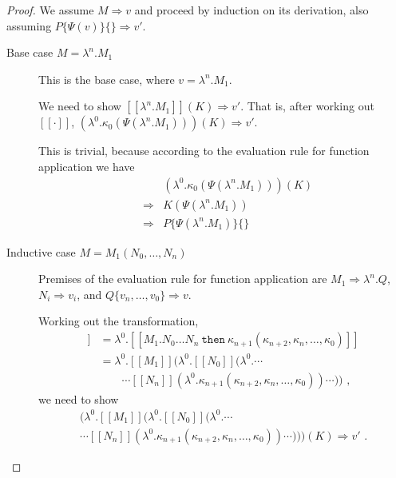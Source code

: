 \documentclass[a4paper,11pt,draft]{article}
\newcommand{\kw}[1]{\mathtt{#1}}
\begin{document}
\begin{proof}
We assume $M \Rightarrow v$ and proceed by induction on its derivation, also
assuming $P\{\Psi(v)\}\{\} \Rightarrow v'$.

\begin{description}
\item[\sffamily Base case $M = \lambda^{n}.M_{1}$]\hfill

  This is the base case, where $v = \lambda^{n}.M_{1}$.

  We need to show $[\![\lambda^{n}.M_{1}]\!] (K) \Rightarrow v'$. That is, after
  working out $[\![\cdot]\!]$,
  $(\lambda^{0}.\kappa_{0}(\Psi(\lambda^{n}.M_{1}))) (K) \Rightarrow v'$.

  This is trivial, because according to the evaluation rule for
  function application we have
  \begin{eqnarray*}
   &             & (\lambda^{0}.\kappa_{0}(\Psi(\lambda^{n}.M_{1}))) (K) \\
   & \Rightarrow & K (\Psi(\lambda^{n}.M_{1})) \\
   & \Rightarrow & P\{\Psi(\lambda^{n}.M_{1})\}\{\}
  \end{eqnarray*}

\item[\sffamily Inductive case $M = M_{1}(N_{0}, \ldots, N_{n})$]\hfill

Premises of the evaluation rule for function application are
$M_{1} \Rightarrow \lambda^{n}.Q$, $N_{i} \Rightarrow v_{i}$,
and $Q\{v_{n}, \ldots, v_{0}\} \Rightarrow v$.

Working out the transformation,
\begin{align*}
  [\![M_{1}(N_{0}, \ldots, N_{n})]\!]
  &= \lambda^{0}.[\![M_{1}.N_{0} \ldots N_{n} \: \kw{then} \: \kappa_{n+1}(\kappa_{n+2}, \kappa_{n}, \ldots, \kappa_{0})]\!] \\
  &= \lambda^{0}.[\![M_{1}]\!](\lambda^{0}.[\![N_{0}]\!](\lambda^{0}. \cdots \\
  &  \qquad \cdots [\![N_{n}]\!](\lambda^{0}.\kappa_{n+1}(\kappa_{n+2}, \kappa_{n}, \ldots, \kappa_{0})) \cdots )) \text{ ,}
\end{align*}
we need to show
\begin{multline}
    (\lambda^{0}.[\![M_{1}]\!](\lambda^{0}.[\![N_{0}]\!](\lambda^{0}. \cdots \\
    \cdots [\![N_{n}]\!](\lambda^{0}.\kappa_{n+1}(\kappa_{n+2}, \kappa_{n}, \ldots, \kappa_{0})) \cdots )))(K) \Rightarrow v' \text{ .}
\end{multline}


\end{description}
\end{proof}
\end{document}
